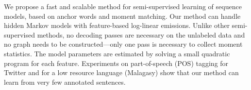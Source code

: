 We propose a fast and scalable method for semi-supervised learning of sequence models, based on anchor words and moment matching. Our method can handle hidden Markov models with feature-based log-linear emissions. Unlike other semi-supervised methods, no decoding passes are necessary on the unlabeled data and no graph needs to be constructed---only one pass is necessary to collect moment statistics. The model parameters are estimated by solving a small quadratic program for each feature. Experiments on part-of-speech (POS) tagging for Twitter and for a low resource language (Malagasy) show that our method can learn from very few annotated sentences.
